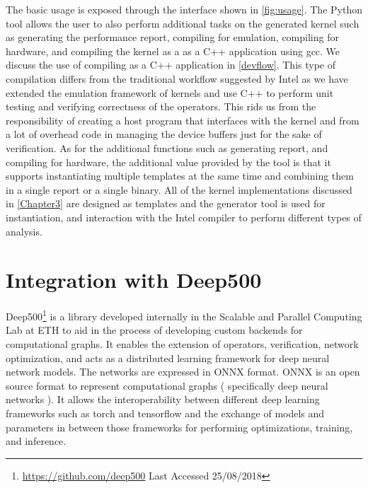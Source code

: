The basic usage is exposed through the interface shown in \ref{fig:usage}. The Python tool allows the user to also perform additional tasks on the generated kernel such as generating the performance report, compiling for emulation, compiling for hardware, and compiling the kernel as a as a C++ application using gcc. We discuss the use of compiling   as a C++ application in \ref{devflow}. This type of compilation differs from the traditional workflow suggested by Intel as we have extended the emulation framework of kernels and use C++ to perform unit testing and verifying correctness of the operators. This rids us from the responsibility of creating a host program that interfaces with the kernel and from a lot of overhead code in managing the device buffers just for the sake of verification. 
As for the additional functions such as generating report, and compiling for hardware, the additional value provided by the tool is that it supports instantiating multiple templates at the same time and combining them in a single report or a single binary. All of the kernel implementations discussed in \ref{Chapter3} are designed as templates and the generator tool is used for instantiation, and interaction with the Intel compiler to perform different types of analysis.

\section{Integration with Deep500}

Deep500\footnote{\url{https://github.com/deep500} Last Accessed 25/08/2018} is a library developed internally in the Scalable and Parallel Computing Lab at ETH to aid in the process of developing custom backends for computational graphs. It enables the extension of operators, verification, network optimization, and acts as a distributed learning framework for deep neural network models. The networks are expressed in ONNX\citep{onnx} format. ONNX is an open source format to represent computational graphs ( specifically deep neural networks ). It allows the interoperability between different deep learning frameworks such as torch\cite{torch} and tensorflow\cite{tensorflow} and the exchange of models and parameters in between those frameworks for performing optimizations, training, and inference. 

